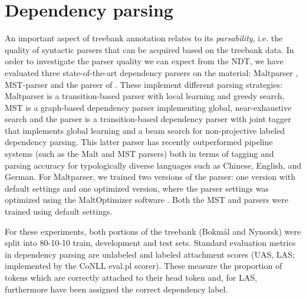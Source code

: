 \documentclass[11pt,a4paper]{article}
\begin{document}
\section{Dependency parsing}
An important aspect of treebank annotation relates to its \emph{parsability},
i.e. the quality of syntactic parsers that can be acquired based on
the treebank data.  In order to investigate the parser quality we can
expect from the NDT, we have evaluated three state-of-the-art dependency
parsers on the material: Maltparser ,
MST-parser  and the parser of
. These implement different parsing strategies: Maltparser is a transition-based parser with local learning and greedy search, MST is a graph-based dependency parser implementing global, near-exhaustive search and the  parser is a transition-based dependency parser with joint tagger that
implements global learning and a beam search for non-projective labeled
dependency parsing. 
This latter parser has recently outperformed pipeline systems (such as the
Malt and MST parsers) both in terms of tagging and parsing accuracy for
typologically diverse languages such as Chinese, English, and German. 
For Maltparser, we trained two versions of the
parser: one version with default settings and one optimized version,
where the parser settings was optimized using the MaltOptimizer
software . Both the MST and 
parsers were trained using default settings.

For these experiments, both portions of the treebank (Bokm{\aa}l and
Nynorsk) were split into 80-10-10 train, development and test sets.
Standard evaluation metrics in dependency parsing are unlabeled and
labeled attachment scores (UAS, LAS; implemented by the CoNLL
\textsf{eval.pl} scorer).  These measure the proportion of tokens
which are correctly attached to their head token and, for LAS,
furthermore have been assigned the correct dependency label.




\end{document}
